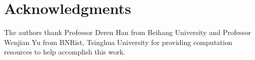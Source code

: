 \section*{Acknowledgments}


The authors thank Professor Deren Han from Beihang University and Professor Wenjian Yu from BNRist, Tsinghua University for providing computation resources to help accomplish this work.
